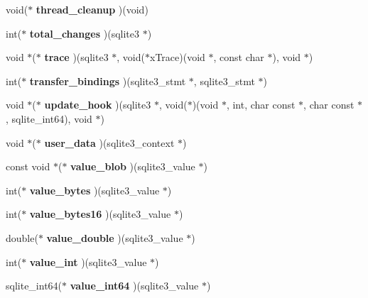 \begin{CompactItemize}
\item 
void($\ast$ \textbf{thread\_\-cleanup} )(void)\label{structsqlite3__api__routines_d12a881cadf72c0af17243aa7993121e}

\item 
int($\ast$ \textbf{total\_\-changes} )(sqlite3 $\ast$)\label{structsqlite3__api__routines_fe877b33cc6849b7d9aa02c9ad1bb57a}

\item 
void $\ast$($\ast$ \textbf{trace} )(sqlite3 $\ast$, void($\ast$xTrace)(void $\ast$, const char $\ast$), void $\ast$)\label{structsqlite3__api__routines_e3c08ba6289b63a42be96bf8da52d8a2}

\item 
int($\ast$ \textbf{transfer\_\-bindings} )(sqlite3\_\-stmt $\ast$, sqlite3\_\-stmt $\ast$)\label{structsqlite3__api__routines_b786ce7288754a0be04ef6d46e7596fe}

\item 
void $\ast$($\ast$ \textbf{update\_\-hook} )(sqlite3 $\ast$, void($\ast$)(void $\ast$, int, char const $\ast$, char const $\ast$, sqlite\_\-int64), void $\ast$)\label{structsqlite3__api__routines_c40dbbad3100106caa20bd27c912a5c2}

\item 
void $\ast$($\ast$ \textbf{user\_\-data} )(sqlite3\_\-context $\ast$)\label{structsqlite3__api__routines_fb39188578dd0f6dac40cbeb44b6ce3a}

\item 
const void $\ast$($\ast$ \textbf{value\_\-blob} )(sqlite3\_\-value $\ast$)\label{structsqlite3__api__routines_d9180b5b37542f97cfd7ea1bf9a9bab4}

\item 
int($\ast$ \textbf{value\_\-bytes} )(sqlite3\_\-value $\ast$)\label{structsqlite3__api__routines_c722dfd6cd6337db8c7f200d5b11f95e}

\item 
int($\ast$ \textbf{value\_\-bytes16} )(sqlite3\_\-value $\ast$)\label{structsqlite3__api__routines_06b01d2b6f80a5b94ca28f7b3b47c98d}

\item 
double($\ast$ \textbf{value\_\-double} )(sqlite3\_\-value $\ast$)\label{structsqlite3__api__routines_a6c0e19bf1a58ad9f05a8c75717cb6eb}

\item 
int($\ast$ \textbf{value\_\-int} )(sqlite3\_\-value $\ast$)\label{structsqlite3__api__routines_c55457e54f0c23e19bbfd8c585a402e4}

\item 
sqlite\_\-int64($\ast$ \textbf{value\_\-int64} )(sqlite3\_\-value $\ast$)\label{structsqlite3__api__routines_36316fdb3b6503e04540a1a10ea94cf5}


\end{CompactItemize}
